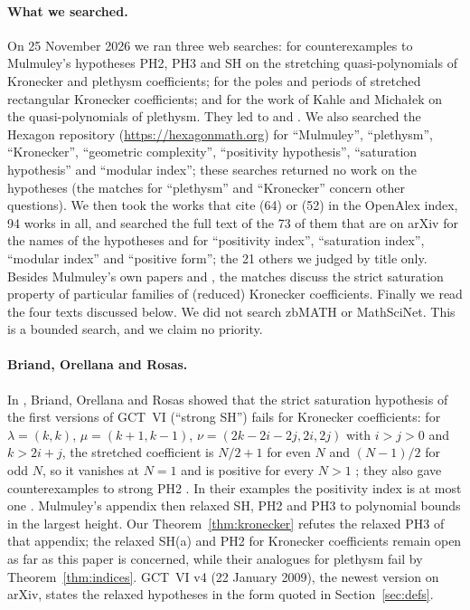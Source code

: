 \documentclass[11pt,a4paper]{article}
\theoremstyle{definition}
\begin{document}
\paragraph{What we searched.}
On 25 November 2026 we ran three web searches: for counterexamples to
Mulmuley's hypotheses PH2, PH3 and SH on the stretching quasi-polynomials of
Kronecker and plethysm coefficients; for the poles and periods of stretched
rectangular Kronecker coefficients; and for the work of Kahle and
Micha\l{}ek on the quasi-polynomials of plethysm. They led to \cite{BOR} and
\cite{KM}. We also searched the Hexagon repository
(\url{https://hexagonmath.org}) for ``Mulmuley'', ``plethysm'',
``Kronecker'', ``geometric complexity'', ``positivity hypothesis'',
``saturation hypothesis'' and ``modular index''; these searches returned no
work on the hypotheses (the matches for ``plethysm'' and ``Kronecker'' concern
other questions). We then took the works that cite \cite{GCT6} (64) or
\cite{BOR} (52) in the OpenAlex index, 94 works in all, and searched the full
text of the 73 of them that are on arXiv for the names of the hypotheses and
for ``positivity index'', ``saturation index'', ``modular index'' and
``positive form''; the 21 others we judged by title only. Besides Mulmuley's
own papers and \cite{BOR}, the matches discuss the strict saturation property
of particular families of (reduced) Kronecker coefficients. Finally we read the
four texts discussed below. We did not search zbMATH or MathSciNet. This is a
bounded search, and we claim no priority.

\paragraph{Briand, Orellana and Rosas.}
In \cite{BOR}, Briand, Orellana and Rosas showed that the strict saturation
hypothesis of the first versions of GCT~VI (``strong SH'') fails for Kronecker
coefficients: for $\lambda=(k,k)$, $\mu=(k+1,k-1)$, $\nu=(2k-2i-2j,2i,2j)$
with $i>j>0$ and $k>2i+j$, the stretched coefficient is $N/2+1$ for even $N$ and $(N-1)/2$ for odd $N$, so it vanishes at $N=1$ and is positive for every $N>1$ \cite[Theorem 2.4, p.~7]{BOR}; they also gave
counterexamples to strong PH2 \cite[Section 2.4, p.~8]{BOR}. In their examples
the positivity index is at most one \cite[Section 2.5, p.~8]{BOR}. Mulmuley's
appendix \cite[pp.~18--20]{BOR} then relaxed SH, PH2 and PH3 to polynomial
bounds in the largest height. Our Theorem~\ref{thm:kronecker} refutes the
relaxed PH3 of that appendix; the relaxed SH(a) and PH2 for Kronecker
coefficients remain open as far as this paper is concerned, while their
analogues for plethysm fail by Theorem~\ref{thm:indices}. GCT~VI v4 (22 January
2009), the newest version on arXiv, states the relaxed hypotheses in the form
quoted in Section~\ref{sec:defs}.
\end{document}
